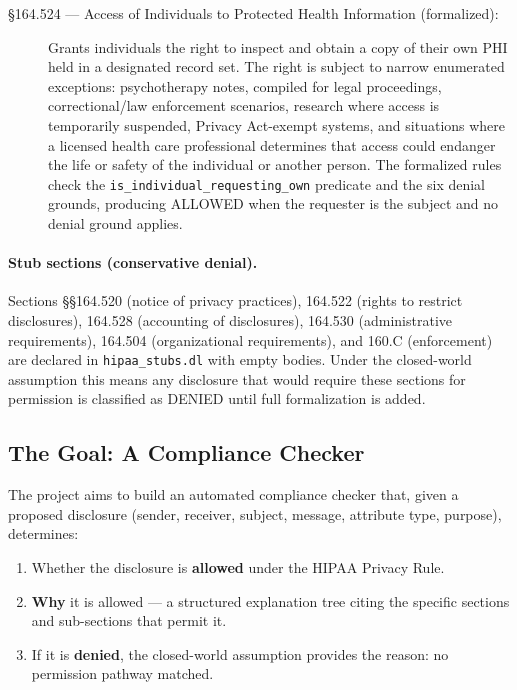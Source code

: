 \documentclass[11pt,letterpaper]{article}
\begin{document}
\begin{description}
  \item[\S 164.524 --- Access of Individuals to Protected Health Information (formalized):]
    Grants individuals the right to inspect and obtain a copy of their own PHI held in a
    designated record set. The right is subject to narrow enumerated exceptions: psychotherapy
    notes, compiled for legal proceedings, correctional/law enforcement scenarios, research where
    access is temporarily suspended, Privacy Act-exempt systems, and situations where a licensed
    health care professional determines that access could endanger the life or safety of the
    individual or another person. The formalized rules check the \texttt{is\_individual\_requesting\_own}
    predicate and the six denial grounds, producing ALLOWED when the requester is the subject
    and no denial ground applies.
\end{description}

\paragraph{Stub sections (conservative denial).}
Sections \S\S 164.520 (notice of privacy practices), 164.522 (rights to restrict disclosures),
164.528 (accounting of disclosures), 164.530 (administrative requirements), 164.504 (organizational
requirements), and 160.C (enforcement) are declared in \texttt{hipaa\_stubs.dl} with empty bodies.
Under the closed-world assumption this means any disclosure that would require these sections
for permission is classified as DENIED until full formalization is added.

\subsection{The Goal: A Compliance Checker}

The project aims to build an automated compliance checker that, given a proposed disclosure (sender, receiver, subject, message, attribute type, purpose), determines:
\begin{enumerate}
  \item Whether the disclosure is \textbf{allowed} under the HIPAA Privacy Rule.
  \item \textbf{Why} it is allowed --- a structured explanation tree citing the specific sections and sub-sections that permit it.
  \item If it is \textbf{denied}, the closed-world assumption provides the reason: no permission pathway matched.
\end{enumerate}
\end{document}

